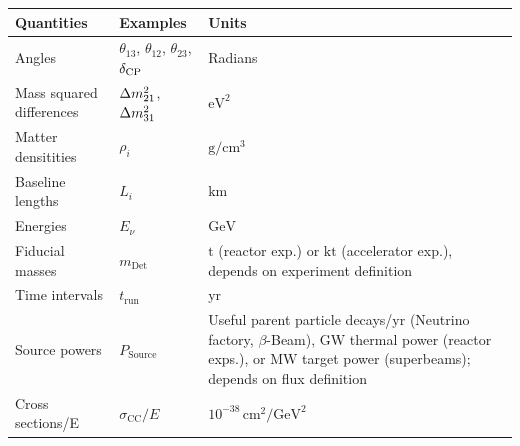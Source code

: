 \begin{table}[tb]
\begin{center}
\begin{tabular}{llp{7cm}}
\hline
Quantities & Examples & Units \\
\hline
Angles & $\theta_{13}$, $\theta_{12}$, $\theta_{23}$, $\delta_{\mathrm{CP}}$ & Radians  \\
Mass squared differences & $\Delta m_{21}^2$, $\Delta m_{31}^2$ & $\mathrm{eV}^2$ \\
Matter densitities & $\rho_i$ & $\mathrm{g}/\mathrm{cm}^3$ \\
Baseline lengths & $L_i$ & $\mathrm{km}$ \\
Energies & $E_\nu$ & $\mathrm{GeV}$ \\  
Fiducial masses & $m_{\mathrm{Det}}$ & $\mathrm{t}$ (reactor exp.) or $\mathrm{kt}$ (accelerator exp.), \newline  depends on experiment definition \\
Time intervals & $t_{\mathrm{run}}$ & $\mathrm{yr}$ \\
Source powers & $P_{\mathrm{Source}}$ & Useful parent particle decays/$\mathrm{yr}$ \newline (Neutrino factory, $\beta$-Beam), \newline $\mathrm{GW}$ thermal power (reactor exps.), \newline or
$\mathrm{MW}$ target power (superbeams); \newline
depends on flux definition
 \\
Cross sections/E & $\sigma_{\mathrm{CC}}/E$ & $10^{-38} \, \mathrm{cm^2}/\mathrm{GeV^2}$ \\
\hline
\end{tabular}
\end{center}
\end{table}

